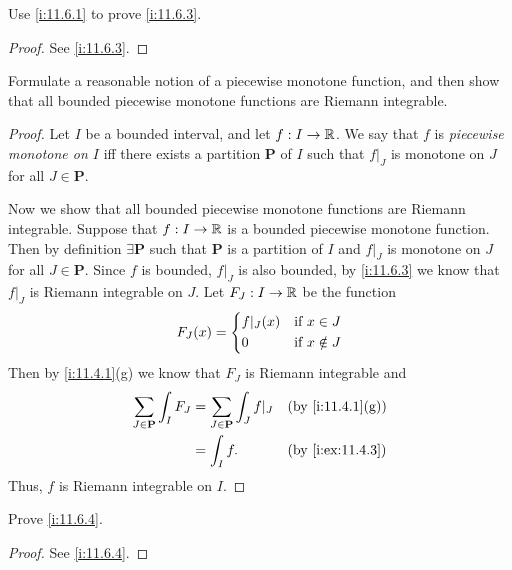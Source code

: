\exercisesection

\begin{ex}\label{i:ex:11.6.1}
  Use \cref{i:11.6.1} to prove \cref{i:11.6.3}.
\end{ex}

\begin{proof}
  See \cref{i:11.6.3}.
\end{proof}

\begin{ex}\label{i:ex:11.6.2}
  Formulate a reasonable notion of a piecewise monotone function, and then show that all bounded piecewise monotone functions are Riemann integrable.
\end{ex}

\begin{proof}
  Let \(I\) be a bounded interval, and let \(f : I \to \mathbb{R}\).
  We say that \(f\) is \emph{piecewise monotone on \(I\)} iff there exists a partition \(\mathbf{P}\) of \(I\) such that \(f|_J\) is monotone on \(J\) for all \(J \in \mathbf{P}\).

  Now we show that all bounded piecewise monotone functions are Riemann integrable.
  Suppose that \(f : I \to \mathbb{R}\) is a bounded piecewise monotone function.
  Then by definition \(\exists \mathbf{P}\) such that \(\mathbf{P}\) is a partition of \(I\) and \(f|_J\) is monotone on \(J\) for all \(J \in \mathbf{P}\).
  Since \(f\) is bounded, \(f|_J\) is also bounded, by \cref{i:11.6.3} we know that \(f|_J\) is Riemann integrable on \(J\).
  Let \(F_J : I \to \mathbb{R}\) be the function
  \[
    F_J(x) = \begin{dcases}
      f|_J(x) & \text{if } x \in J    \\
      0       & \text{if } x \notin J
    \end{dcases}
  \]
  Then by \cref{i:11.4.1}(g) we know that \(F_J\) is Riemann integrable and
  \begin{align*}
    \sum_{J \in \mathbf{P}} \int_I F_J & = \sum_{J \in \mathbf{P}} \int_J f|_J &  & \by{i:11.4.1}[g] \\
                                       & = \int_I f.                           &  & \by{i:ex:11.4.3}
  \end{align*}
  Thus, \(f\) is Riemann integrable on \(I\).
\end{proof}

\begin{ex}\label{i:ex:11.6.3}
  Prove \cref{i:11.6.4}.
\end{ex}

\begin{proof}
  See \cref{i:11.6.4}.
\end{proof}

